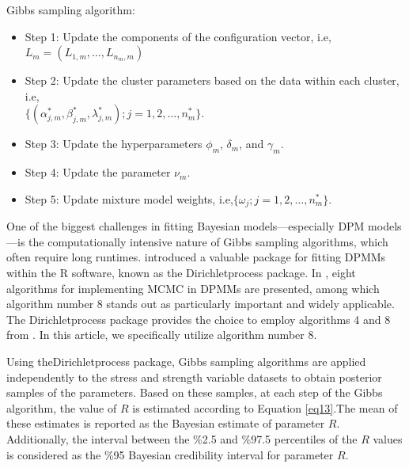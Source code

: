 \documentclass[twoside]{article}
\begin{document}
\begin{alg}\label{alg}
Gibbs sampling algorithm:
\begin{itemize}
\item Step 1: Update the components of the configuration vector, i.e, \(L_{m} = (L_{1,m},\ldots,L_{n_{m},m})\)
\item Step 2: Update the cluster parameters based on the data within each cluster, i.e,\\\(\{(\alpha^{*}_{j,m},\beta^{*}_{j,m},\lambda^{*}_{j,m}); j=1,2,\ldots,n_{m}^{*}\}\).
\item Step 3: Update the hyperparameters $\phi_{m}$, $\delta_{m}$, and $\gamma_{m}$.
\item Step 4: Update the parameter $\nu_{m}$.
\item Step 5: Update mixture model weights, i.e,\(\{\omega_{j}; j=1,2,\ldots,n_{m}^{*}\}\).
\end{itemize}
\end{alg}

One of the biggest challenges in fitting Bayesian models—especially DPM models—is the computationally intensive nature of Gibbs sampling algorithms, which often require long runtimes. \cite{Ross-Markwick} introduced a valuable package for fitting DPMMs within the R software, known as the Dirichletprocess package.  In \cite{neal2000}, eight algorithms for implementing MCMC in DPMMs are presented, among which algorithm number 8 stands out as particularly important and widely applicable. The Dirichletprocess package provides the choice to employ algorithms 4 and 8 from \citep{neal2000}. In this article, we specifically utilize algorithm number 8. 

Using theDirichletprocess package, Gibbs sampling algorithms are applied independently to the stress and strength variable datasets to obtain posterior samples of the parameters. Based on these samples, at each step of the Gibbs algorithm, the value of \( R \) is estimated according to Equation \eqref{eq13}.The mean of these estimates is reported as the Bayesian estimate of parameter \( R \). Additionally, the interval between the \%2.5 and \%97.5 percentiles of the \( R \) values is considered as the \%95 Bayesian credibility interval for parameter \( R \).
\end{document}
